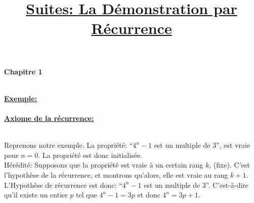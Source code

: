\documentclass[12pt, a4paper]{article}
\makeatletter
\renewcommand\maketitle{
{\raggedright
{\large \bfseries Chapitre 1}\\[4ex]
{\Large \bfseries \@title}\\[4ex]}}
\makeatother
\begin{document}
    \title{\underline{Suites: La Démonstration par Récurrence}}
    \maketitle

    \textbf{\underline{Exemple:}}\\[2ex]
     \\[4ex]
    \indent \textbf{\underline{Axiome de la récurrence:}}\\[2ex]
    \\[4ex]
    {\indent\parbox[t]{\dimexpr\linewidth-\parindent}{
        Reprenons notre exemple. La propriété: ``$4^n-1$ est un multiple de 3'', est vraie pour $n=0$. La propriété est donc initialisée.\\[2ex]
        Hérédité: Supposons que la propriété est vraie à un certain rang $k$, (fixe). C'est l'hypothèse de la récurrence, et montrons qu'alors, elle est vraie au rang $k+1$.\\[2ex]
        L'Hypothèse de récurrence est donc: ``$4^n-1$ est un multiple de 3''. C'est-à-dire qu'il existe un entier $p$ tel que $4^n-1=3p$ et donc $4^n=3p+1$. \pagebreak
    }}
\end{document}
